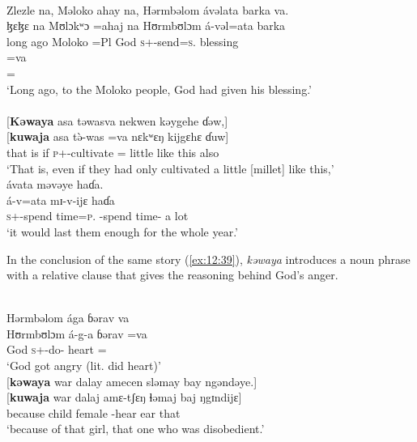 \clearpage
\largerpage
\ea \label{ex:12:38}\\
Zlezle na, Məloko ahay na, Hərmbəlom ávəlata barka va.\\ 
\gll  ɮɛɮɛ na Mʊlɔkʷɔ =ahaj na Hʊrmbʊlɔm á-vəl=ata barka\\ 
     {long ago} {\PSP} Moloko =Pl  {\PSP} God \textsc{s}+{\IFV}-send=\textsc{s}.{\IO}   blessing\\   
     
     \medskip
\gll =va\\ 
     ={\PRF}\\
\glt ‘Long ago, to the Moloko people, God had given his blessing.’\\

\medskip{}\\\relax
{}[\textbf{Kəwaya} asa  təwasva  nekwen  kəygehe  ɗəw,]\\  
\gll {}[\textbf{kuwaja} asa t\`{ə}-was =va nɛkʷɛŋ kijgɛhɛ ɗuw]\\ 
     {that is}  if \textsc{p}+{\PFV}-cultivate ={\PRF} little {like this} also\\ 
\glt ‘That is, even if they had only cultivated a little [millet] like this,’\\

\medskip
ávata  məvəye  haɗa.\\
\gll á-v=ata mɪ-v-ijɛ haɗa\\
    \textsc{s}+{\IFV}-{spend time}=\textsc{p}.{\IO} {\NOM}{}-{spend time}-{\CL} {a lot}\\
\glt  ‘it would last them enough for the whole year.’
\z  

In the conclusion of the same story (\ref{ex:12:39}), \textit{kəwaya} introduces a noun phrase with a relative clause that gives the reasoning behind God’s anger.

\ea \label{ex:12:39}
\\
Hərmbəlom  ága  ɓərav  va\\  
\gll  Hʊrmbʊlɔm   á-g-a  ɓərav     =va \\   
      God    \textsc{s}+{\IFV}-do-{\CL}    heart   ={\PRF} \\
\glt ‘God got angry (lit. did heart)’\\      
      
      \medskip
{}[\textbf{kəwaya}  war  dalay  amecen  sləmay  bay  ngəndəye.]\\      
\gll {}[\textbf{kuwaja} war dalaj amɛ-tʃɛŋ ɬəmaj baj ŋgɪndijɛ] \\
     because  child  female  {\DEP}-hear  ear  {\NEG}  that\\
\glt  ‘because of that girl, that one who was disobedient.’
\z 

